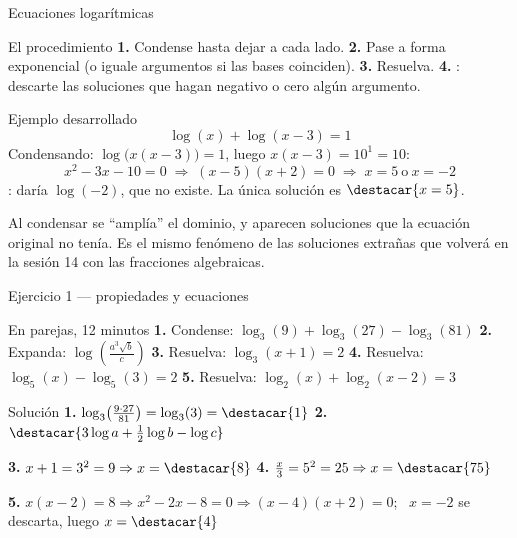 \documentclass[aspectratio=169,10pt]{beamer}
\begin{document}
\begin{frame}{Ecuaciones logarítmicas}
  \scriptsize
  \begin{block}{El procedimiento}
    \tiny
    \textbf{1.} Condense hasta dejar  a cada lado.
    \quad
    \textbf{2.} Pase a forma exponencial (o iguale argumentos si las bases
    coinciden). \quad
    \textbf{3.} Resuelva. \quad
    \textbf{4.} : descarte las soluciones que hagan
    negativo o cero algún argumento.
  \end{block}

  \vspace{0.1cm}
  \begin{exampleblock}{Ejemplo desarrollado}
    \tiny
    \[ \log(x) + \log(x-3) = 1 \]
    Condensando: $\log\!\big(x(x-3)\big) = 1$, luego
    $x(x-3) = 10^{1} = 10$:
    \[ x^{2}-3x-10 = 0 \;\Longrightarrow\; (x-5)(x+2)=0
       \;\Longrightarrow\; x=5 \ \text{o} \ x=-2 \]
    : daría $\log(-2)$, que no existe. La única
    solución es $\destacar{x=5}$.
  \end{exampleblock}

  \vspace{0.06cm}
  {\tiny\color{uniGris}  Al condensar se
  ``amplía'' el dominio, y aparecen soluciones que la ecuación original no
  tenía. Es el mismo fenómeno de las soluciones extrañas que volverá en la
  sesión 14 con las fracciones algebraicas.}
\end{frame}

\begin{frame}{Ejercicio 1 — propiedades y ecuaciones}
  \scriptsize
  \begin{alertblock}{En parejas, 12 minutos}
    \tiny
    \textbf{1.} Condense: $\log_{3}(9)+\log_{3}(27)-\log_{3}(81)$ \qquad
    \textbf{2.} Expanda: $\log\!\left(\tfrac{a^{3}\sqrt{b}}{c}\right)$ \qquad
    \textbf{3.} Resuelva: $\log_{3}(x+1)=2$ \qquad
    \textbf{4.} Resuelva: $\log_{5}(x)-\log_{5}(3)=2$ \qquad
    \textbf{5.} Resuelva: $\log_{2}(x)+\log_{2}(x-2)=3$
  \end{alertblock}

  \vspace{0.05cm}
  \begin{block}{Solución}
    \tiny
    \textbf{1.} $\log_{3}\!\left(\tfrac{9\cdot 27}{81}\right)
    = \log_{3}(3) = \destacar{1}$ \qquad
    \textbf{2.} $\destacar{3\log a + \tfrac{1}{2}\log b - \log c}$

    \vspace{0.08cm}
    \textbf{3.} $x+1 = 3^{2} = 9 \Rightarrow x=\destacar{8}$ \qquad
    \textbf{4.} $\tfrac{x}{3}=5^{2}=25 \Rightarrow x=\destacar{75}$

    \vspace{0.08cm}
    \textbf{5.} $x(x-2)=8 \Rightarrow x^{2}-2x-8=0
    \Rightarrow (x-4)(x+2)=0$; \ $x=-2$ se descarta, luego
    $x=\destacar{4}$
  \end{block}
\end{frame}
\end{document}
